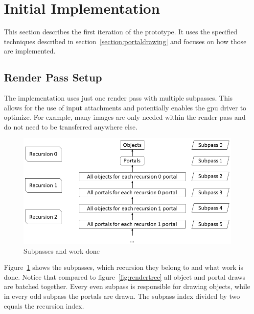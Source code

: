 \section{Initial Implementation}
\label{section:intialimplementation}
This section describes the first iteration of the prototype. It uses the specified techniques described in section~\ref{section:portaldrawing} and focuses on how those are implemented.


\subsection{Render Pass Setup}
\label{section:renderpasssetup}

The implementation uses just one render pass with multiple subpasses. This allows for the use of input attachments and potentially enables the \gls{gpu} driver to optimize. For example, many images are only needed within the render pass and do not need to be transferred anywhere else.

\begin{figure}[h]
	\includegraphics[width=\linewidth]{images/renderpasses.png}
	\caption{Subpasses and work done}
	\label{fig:renderpasses}
\end{figure}


Figure~\ref{fig:renderpasses} shows the subpasses, which recursion they belong to and what work is done. Notice that compared to figure~\ref{fig:rendertree} all object and portal draws are batched together. Every even subpass is responsible for drawing objects, while in every odd subpass the portals are drawn. The subpass index divided by two equals the recursion index. 

